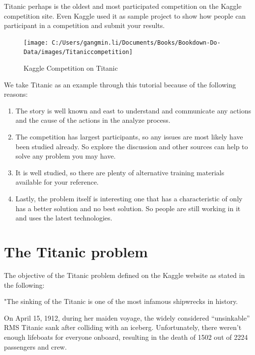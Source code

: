 \documentclass[
]{book}
\providecommand{\tightlist}{%
  \setlength{\itemsep}{0pt}\setlength{\parskip}{0pt}}
\begin{document}
Titanic perhaps is the oldest and most participated competition on the Kaggle competition site. Even Kaggle used it as sample project to show how people can participant in a competition and submit your results.

\begin{figure}

{\centering \texttt{[image: C:/Users/gangmin.li/Documents/Books/Bookdown-Do-Data/images/Titaniccompetition]} 

}

\caption{Kaggle Competition on Titanic}\label{fig:unnamed-chunk-11}
\end{figure}

We take Titanic as an example through this tutorial because of the following reasons:

\begin{enumerate}
\def\labelenumi{\arabic{enumi}.}
\tightlist
\item
  The story is well known and east to understand and communicate any actions and the cause of the actions in the analyze process.
\item
  The competition has largest participants, so any issues are most likely have been studied already. So explore the discussion and other sources can help to solve any problem you may have.
\item
  It is well studied, so there are plenty of alternative training materials available for your reference.
\item
  Lastly, the problem itself is interesting one that has a characteristic of only has a better solution and no best solution. So people are still working in it and uses the latest technologies.
\end{enumerate}

\hypertarget{the-titanic-problem}{%
\section{The Titanic problem}\label{the-titanic-problem}}

The objective of the Titanic problem defined on the Kaggle website as stated in the following:

"The sinking of the Titanic is one of the most infamous shipwrecks in history.

On April 15, 1912, during her maiden voyage, the widely considered ``unsinkable'' RMS Titanic sank after colliding with an iceberg. Unfortunately, there weren't enough lifeboats for everyone onboard, resulting in the death of 1502 out of 2224 passengers and crew.
\end{document}
